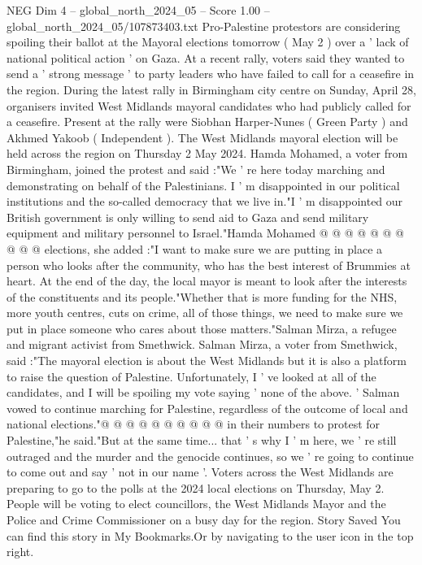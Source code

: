 \begin{textsample}{NEG Dim 4 – global\_north\_2024\_05 – Score 1.00 – global\_north\_2024\_05/107873403.txt}  \label{ex:f4_neg_124}
Pro-Palestine protestors are considering spoiling their ballot at the Mayoral elections tomorrow ( May 2 ) over a ' lack of national political action ' on Gaza.
At a recent rally, voters said they wanted to send a ' strong message ' to party leaders who have failed to call for a ceasefire in the region.
During the latest rally in Birmingham city centre on Sunday, April 28, organisers invited West Midlands mayoral candidates who had publicly called for a ceasefire.
Present at the rally were Siobhan Harper-Nunes ( Green Party ) and Akhmed Yakoob ( Independent ).
The West Midlands mayoral election will be held across the region on Thursday 2 May 2024.
Hamda Mohamed, a voter from Birmingham, joined the protest and said :"We ' re here today marching and demonstrating on behalf of the Palestinians.
I ' m disappointed in our political institutions and the so-called democracy that we live in."I ' m disappointed our British government is only willing to send aid to Gaza and send military equipment and military personnel to Israel."Hamda Mohamed @ @ @ @ @ @ @ @ @ @ elections, she added :"I want to make sure we are putting in place a person who looks after the community, who has the best interest of Brummies at heart.
At the end of the day, the local mayor is meant to look after the interests of the constituents and its people."Whether that is more funding for the NHS, more youth centres, cuts on crime, all of those things, we need to make sure we put in place someone who cares about those matters."Salman Mirza, a refugee and migrant activist from Smethwick.
Salman Mirza, a voter from Smethwick, said :"The mayoral election is about the West Midlands but it is also a platform to raise the question of Palestine.
Unfortunately, I ' ve looked at all of the candidates, and I will be spoiling my vote saying ' none of the above. ' Salman vowed to continue marching for Palestine, regardless of the outcome of local and national elections."@ @ @ @ @ @ @ @ @ @ in their numbers to protest for Palestine,"he said."But at the same time... that ' s why I ' m here, we ' re still outraged and the murder and the genocide continues, so we ' re going to continue to come out and say ' not in our name '.
Voters across the West Midlands are preparing to go to the polls at the 2024 local elections on Thursday, May 2.
People will be voting to elect councillors, the West Midlands Mayor and the Police and Crime Commissioner on a busy day for the region.
Story Saved You can find this story in My Bookmarks.Or by navigating to the user icon in the top right.

\end{textsample}
